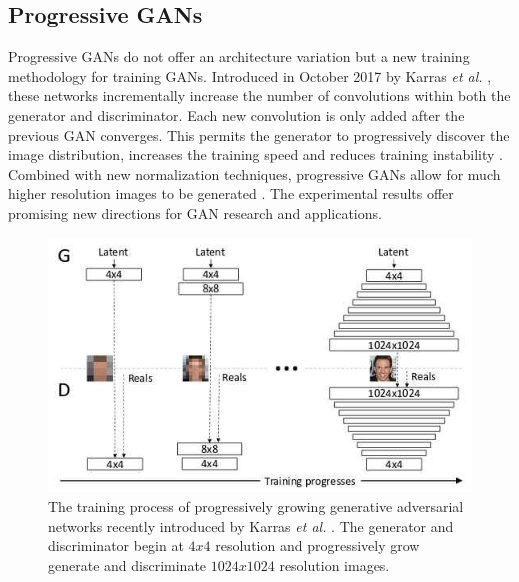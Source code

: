 \documentclass[11pt]{article}
\begin{document}
\subsection{Progressive GANs} \label{sec:proggans}
Progressive GANs do not offer an architecture variation but a new training methodology for training GANs. Introduced in October 2017 by Karras \textit{et al.} \citep{2017arXiv171010196K}, these networks incrementally increase the number of convolutions within both the generator and discriminator. Each new convolution is only added after the previous GAN converges. This permits the generator to progressively discover the image distribution, increases the training speed and reduces training instability \citep{2017arXiv171010196K}. Combined with new normalization techniques, progressive GANs allow for much higher resolution images to be generated \citep{2017arXiv171010196K}. The experimental results offer promising new directions for GAN research and applications.

\begin{figure}
\centering
\includegraphics[scale=0.45]{progressive_growing}
\caption{The training process of progressively growing generative adversarial networks recently introduced by Karras \textit{et al.} \citep{2017arXiv171010196K}. The generator and discriminator begin at $4x4$ resolution and progressively grow generate and discriminate $1024x1024$ resolution images.}
\label{fig:ProgressiveGrowingGAN}
\end{figure}
\end{document}
